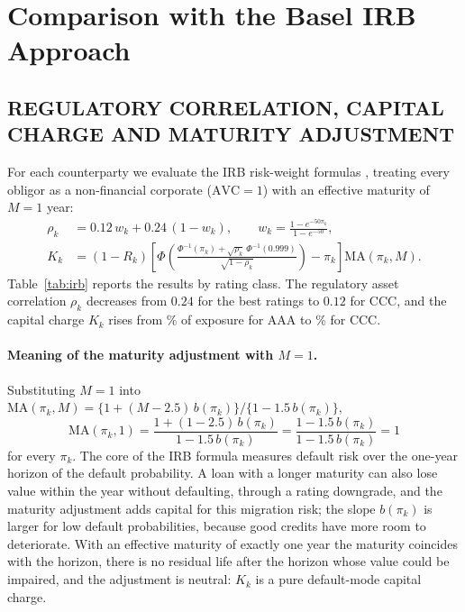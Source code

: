 \section{Comparison with the Basel IRB Approach}
\label{sec:irb}

\subsection{REGULATORY CORRELATION, CAPITAL CHARGE AND MATURITY ADJUSTMENT}
\label{subsec:irbcap}
For each counterparty we evaluate the IRB risk-weight formulas \citep{BCBS05}, treating every obligor as a non-financial corporate ($\mathrm{AVC}=1$) with an effective maturity of $M=1$ year:
\begin{align*}
\rho_k&=0.12\,w_k+0.24\,(1-w_k),\qquad w_k=\frac{1-e^{-50\pi_k}}{1-e^{-50}},\\
K_k&=(1-R_k)\left[\Phi\!\left(\frac{\Phi^{-1}(\pi_k)+\sqrt{\rho_k}\,\Phi^{-1}(0.999)}{\sqrt{1-\rho_k}}\right)-\pi_k\right]\mathrm{MA}(\pi_k,M).
\end{align*}
Table~\ref{tab:irb} reports the results by rating class. The regulatory asset correlation $\rho_k$ decreases from $0.24$ for the best ratings to $0.12$ for CCC, and the capital charge $K_k$ rises from \% of exposure for AAA to \% for CCC.

\begin{table}[tb]
\caption{Basel IRB quantities by rating class ($\mathrm{AVC}=1$, $M=1$). $\bar K_k$ and $\overline{\mathrm{LGD}}$ are unweighted averages within the class; amounts in USD. The last column reports the average systematic weight $\lambda_k$ of the model for comparison.}
\label{tab:irb}
\centering
{}
\end{table}

\paragraph{Meaning of the maturity adjustment with $M=1$.}
Substituting $M=1$ into $\mathrm{MA}(\pi_k,M)=\{1+(M-2.5)\,b(\pi_k)\}/\{1-1.5\,b(\pi_k)\}$,
\[
\mathrm{MA}(\pi_k,1)=\frac{1+(1-2.5)\,b(\pi_k)}{1-1.5\,b(\pi_k)}=\frac{1-1.5\,b(\pi_k)}{1-1.5\,b(\pi_k)}=1
\]
for every $\pi_k$. The core of the IRB formula measures default risk over the one-year horizon of the default probability. A loan with a longer maturity can also lose value within the year without defaulting, through a rating downgrade, and the maturity adjustment adds capital for this migration risk; the slope $b(\pi_k)$ is larger for low default probabilities, because good credits have more room to deteriorate. With an effective maturity of exactly one year the maturity coincides with the horizon, there is no residual life after the horizon whose value could be impaired, and the adjustment is neutral: $K_k$ is a pure default-mode capital charge.

